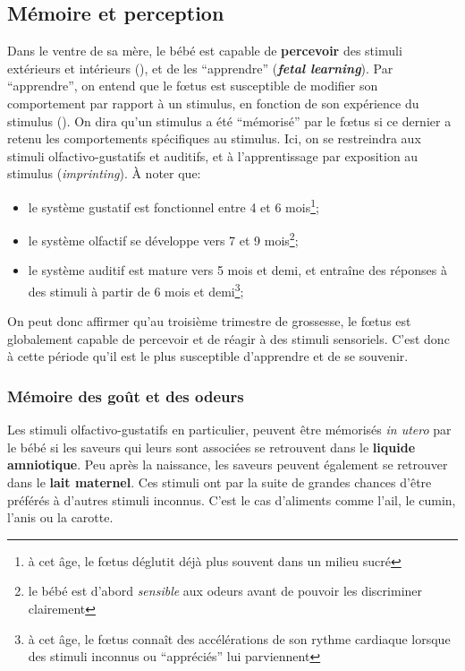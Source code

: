 \documentclass[french]{article}
\begin{document}
			\subsection{Mémoire et perception}\label{perception}
				Dans le ventre de sa mère, le bébé est capable de \textbf{percevoir} des stimuli extérieurs et intérieurs (\cite{busnel2010}), et de les ``apprendre'' (\textbf{\textit{fetal learning}}). Par ``apprendre'', on entend que le fœtus est susceptible de modifier son comportement par rapport à un stimulus, en fonction de son expérience du stimulus (\cite{james2010}). On dira qu'un stimulus a été ``mémorisé'' par le fœtus si ce dernier a retenu  les comportements spécifiques au stimulus.  Ici, on se restreindra aux stimuli olfactivo-gustatifs et auditifs, et à l'apprentissage par exposition au stimulus (\textit{imprinting}). À noter que:
				\begin{itemize}
					\item le système gustatif est fonctionnel entre 4 et 6 mois\footnote{à cet âge, le fœtus déglutit déjà plus souvent dans un milieu sucré};
					\item le système olfactif se développe vers 7 et 9 mois\footnote{le bébé est d'abord \textit{sensible} aux odeurs avant de pouvoir les discriminer clairement};
					\item le système auditif est mature vers 5 mois et demi, et entraîne des réponses à des stimuli à partir de 6 mois et demi\footnote{à cet âge, le fœtus connaît des accélérations de son rythme cardiaque lorsque des stimuli inconnus ou ``appréciés'' lui parviennent};
				\end{itemize}\vspace{2mm}
				On peut donc affirmer qu'au troisième trimestre de grossesse, le fœtus est globalement capable de percevoir et de réagir à des stimuli sensoriels. C'est donc à cette période qu'il est le plus susceptible d'apprendre et de se souvenir.
			
			\subsubsection{Mémoire des goût et des odeurs}
				Les stimuli olfactivo-gustatifs en particulier, peuvent être mémorisés \textit{in utero} par le bébé si les saveurs qui leurs sont associées se retrouvent dans le \textbf{liquide amniotique}. Peu après la naissance, les saveurs peuvent également se retrouver dans le \textbf{lait maternel}. Ces stimuli ont par la suite de grandes chances d'être préférés à d'autres stimuli inconnus. C'est le cas d'aliments comme l'ail, le cumin, l'anis ou la carotte.\\
				
\end{document}

